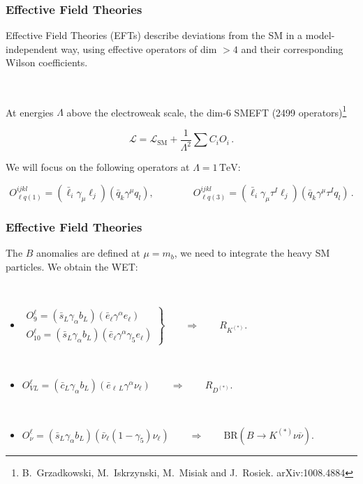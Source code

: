 \documentclass[mathserif, 10pt]{beamer}
\begin{document}
\begin{frame}
    \frametitle{Effective Field Theories}

    Effective Field Theories (EFTs) describe deviations from the SM in a model-independent way, using effective operators of dim $>4$ and their corresponding Wilson coefficients.

    ~

    At energies $\Lambda$ above the electroweak scale, the dim-6 SMEFT (2499 operators)\footnote[1]{B.~Grzadkowski, M.~Iskrzynski, M.~Misiak and J.~Rosiek. arXiv:1008.4884}

    $$\mathcal{L} = \mathcal{L}_\mathrm{SM} + \frac{1}{\Lambda^2}\sum C_i O_i\,.$$

    We will focus on the following operators at $\Lambda = 1\,\mathrm{TeV}$:

    $$O_{\ell q(1)}^{ijkl} = (\bar{\ell}_i \gamma_\mu \ell_j)(\bar{q}_k \gamma^\mu  q_l),\qquad\qquad O_{\ell q(3)}^{ijkl}= (\bar{\ell}_i \gamma_\mu \tau^I \ell_j)(\bar{q}_k \gamma^\mu \tau^I q_l)\,.$$

\end{frame}

\begin{frame}

    \frametitle{Effective Field Theories}
    The $B$ anomalies are defined at $\mu=m_b$, we need to integrate the heavy SM particles. We obtain the WET\@:

    ~

    \begin{itemize}
        \item $\left.\begin{matrix}
                      O_9^\ell = (\bar{s}_L \gamma_\alpha b_L)(\bar{e}_\ell \gamma^\alpha e_\ell) \\
                      O_{10}^\ell = (\bar{s}_L \gamma_\alpha b_L)(\bar{e}_\ell \gamma^\alpha \gamma_5 e_\ell)
                  \end{matrix}\right\} \qquad \Longrightarrow \qquad R_{K^{(*)}}$. %

              ~

        \item $O_{VL}^\ell = (\bar{c}_L \gamma_\alpha b_L)(\bar{e}_{\ell\,L} \gamma^\alpha \nu_\ell) \qquad\Longrightarrow\qquad R_{D^{(*)}}$.

              ~

        \item $O_\nu^\ell = (\bar{s}_L \gamma_\alpha b_L)(\bar{\nu}_\ell (1-\gamma_5) \nu_\ell) \qquad\Longrightarrow \qquad \mathrm{BR}(B\to K^{(*)}\nu\overline{\nu})$.
    \end{itemize}



\end{frame}
\end{document}
